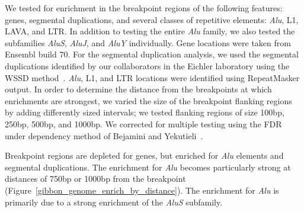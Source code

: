 We tested for enrichment in the breakpoint regions of the following features: genes, segmental duplications, and several classes of repetitive elements: \emph{Alu}, L1, LAVA, and LTR. In addition to testing the entire \emph{Alu} family, we also tested the subfamilies \emph{AluS}, \emph{AluJ}, and \emph{AluY} individually. Gene locations were taken from Ensembl build 70. For the segmental duplication analysis, we used the segmental duplications identified by our collaborators in the Eichler laboratory using the WSSD method~\cite{Bailey:2002jp}. \emph{Alu}, L1, and LTR locations were identified using RepeatMasker output. In order to determine the distance from the breakpoints at which enrichments are strongest, we varied the size of the breakpoint flanking regions by adding differently sized intervals; we tested flanking regions of size 100bp, 250bp, 500bp, and 1000bp. We corrected for multiple testing using the FDR under dependency method of Bejamini and Yekutieli~\cite{Benjamini:2001fs}. 

Breakpoint regions are depleted for genes, but enriched for \emph{Alu} elements and segmental duplications. The enrichment for \emph{Alu} becomes particularly strong at distances of 750bp or 1000bp from the breakpoint (Figure~\ref{gibbon_genome_enrich_by_distance}). The enrichment for \emph{Alu} is primarily due to a strong enrichment of the \emph{AluS} subfamily.

